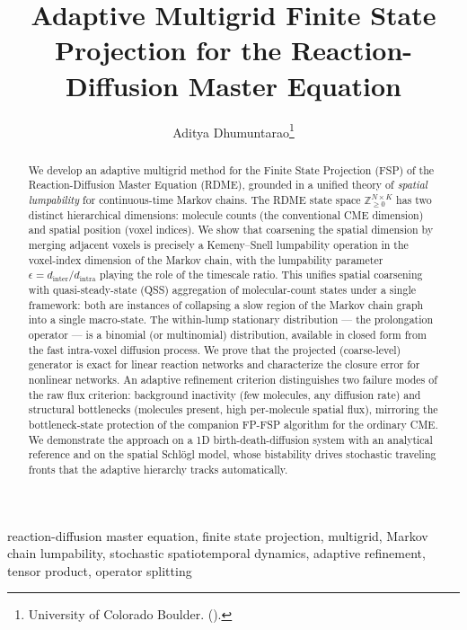 \documentclass[review,onefignum,onetabnum]{siamart171218}
\title{Adaptive Multigrid Finite State Projection for the
  Reaction-Diffusion Master Equation}
\author{
  Aditya Dhumuntarao\thanks{%
    University of Colorado Boulder.
    (\email{aditya.dhumuntarao@colorado.edu}).}
}
\newcommand{\Znn}{\mathbb{Z}_{\geq 0}}
\begin{document}
\maketitle

\begin{abstract}
We develop an adaptive multigrid method for the Finite State
Projection (FSP) of the Reaction-Diffusion Master Equation
(RDME), grounded in a unified theory of \emph{spatial lumpability}
for continuous-time Markov chains.  The RDME state space
$\Znn^{N \times K}$ has two distinct hierarchical dimensions:
molecule counts (the conventional CME dimension) and spatial
position (voxel indices).  We show that coarsening the spatial
dimension by merging adjacent voxels is precisely a
Kemeny--Snell lumpability operation in the voxel-index
dimension of the Markov chain, with the lumpability parameter
$\epsilon = d_{\mathrm{inter}} / d_{\mathrm{intra}}$ playing
the role of the timescale ratio.  This unifies spatial
coarsening with quasi-steady-state (QSS) aggregation of
molecular-count states under a single framework: both are
instances of collapsing a slow region of the Markov chain
graph into a single macro-state.  The within-lump stationary
distribution --- the prolongation operator --- is a binomial
(or multinomial) distribution, available in closed form from
the fast intra-voxel diffusion process.
We prove that the projected (coarse-level) generator is exact
for linear reaction networks and characterize the closure error
for nonlinear networks.  An adaptive refinement criterion
distinguishes two failure modes of the raw flux criterion:
background inactivity (few molecules, any diffusion rate) and
structural bottlenecks (molecules present, high per-molecule
spatial flux), mirroring the bottleneck-state protection of the
companion FP-FSP algorithm for the ordinary CME.
We demonstrate the approach on a 1D birth-death-diffusion
system with an analytical reference and on the spatial
Schl\"{o}gl model, whose bistability drives stochastic
traveling fronts that the adaptive hierarchy tracks automatically.
\end{abstract}

\begin{keywords}
  reaction-diffusion master equation, finite state projection,
  multigrid, Markov chain lumpability, stochastic spatiotemporal
  dynamics, adaptive refinement, tensor product, operator splitting
\end{keywords}
\end{document}
